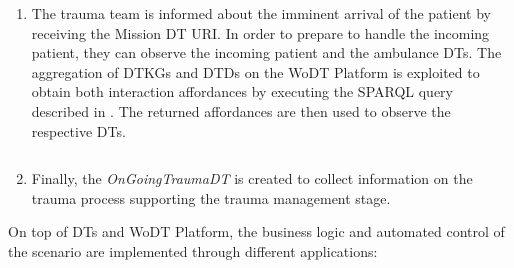 \begin{enumerate}
    \begin{code}
    \label{lst:mission-dtkg}
    \inputminted{turtle}{listings/hwodt/use-case/dtkg-missiondt.ttl}
    \end{code}
    
    Meanwhile, the patient's tax code, if available, is collected and the associated \emph{Healthcare User \ac{DT}} is discovered via the Platform DT Discovery Service. This service, starting from a \ac{PA} identifier, returns the corresponding \acp{DT} within the ecosystem. Subsequently, a relationship is established with the Patient \ac{DT}.
    \item The trauma team is informed about the imminent arrival of the patient by receiving the Mission \ac{DT} \ac{URI}. In order to prepare to handle the incoming patient, they can observe the incoming patient and the ambulance \acp{DT}.
    The aggregation of \acp{DTKG} and \acp{DTD} on the \ac{WoDT} Platform is exploited to obtain both interaction affordances by executing the SPARQL query described in . The returned affordances are then used to observe the respective \acp{DT}.

    \begin{code}
    \label{lst:patient-ambulance-observation-endpoints-query}
    \inputminted{sparql}{listings/hwodt/use-case/patient-ambulance-observation-endpoints-query.rq}
    \end{code}
    
    
    \item Finally, the \emph{OnGoingTraumaDT} is created to collect information on the trauma process supporting the trauma management stage.
\end{enumerate}

On top of \acp{DT} and \ac{WoDT} Platform, the business logic and automated control of the scenario are implemented through different applications:

